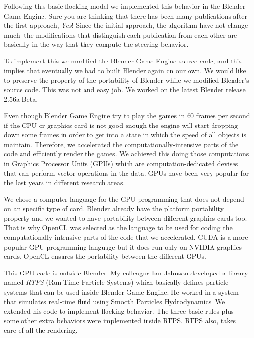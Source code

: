 Following this basic flocking model we implemented this behavior in the Blender Game Engine. Sure you are thinking that there has been many publications after the first approach, \textit{Yes}!  Since the initial approach, the algorithm have not change much, the modifications that distinguish each publication from each other are basically in the way that they compute the steering behavior.

To implement this we modified the Blender Game Engine source code, and this implies that eventually we had to built Blender again on our own. We would like to preserve the property of the portability of Blender while we modified Blender's source code. This was not and easy job. We worked on the latest Blender release 2.56a Beta. 


Even though Blender Game Engine try to play the games in 60 frames per second \cite{bookGameKit2} if the CPU or graphics card is not good enough the engine will start dropping down some frames in order to get into a state in which the speed of all objects is maintain. Therefore, we accelerated the computationally-intensive parts of the code and efficiently render the games. We achieved this doing those computations in Graphics Processor Units (GPUs) which are computation-dedicated devises that can perform vector operations in the data. GPUs have been very popular for the last years in different research areas. 

We chose a computer language for the GPU programming that does not depend on an specific type of card. Blender already have the platform portability property  and we wanted to have portability between different graphics cards too. That is why OpenCL was selected as the language to be used for coding the computationally-intensive parts of the code that we accelerated. CUDA is a more popular GPU programming language but it does run only on NVIDIA graphics cards. OpenCL ensures the portability between the different GPUs.


This GPU code is outside Blender. My colleague Ian Johnson\cite{ianBlog} developed a library named \textit{RTPS} (Run-Time Particle Systems) which basically defines particle systems that can be used inside Blender Game Engine. He worked in a system that simulates real-time fluid using Smooth Particles Hydrodynamics. We extended his code to implement flocking behavior. The three basic rules plus some other extra behaviors were implemented inside RTPS. RTPS also, takes care of all the rendering.

